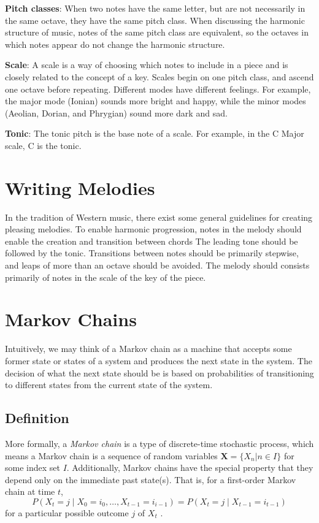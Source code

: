 \textbf{Pitch classes}: When two notes have the same letter, but are not necessarily in the same octave, they have the same pitch class.
When discussing the harmonic structure of music, notes of the same pitch class are equivalent, so the octaves in which notes appear do not change the harmonic structure.

\textbf{Scale}: A scale is a way of choosing which notes to include in a piece and is closely related to the concept of a key.
Scales begin on one pitch class, and ascend one octave before repeating.
Different modes have different feelings.
For example, the major mode (Ionian) sounds more bright and happy, while the minor modes (Aeolian, Dorian, and Phrygian) sound more dark and sad.

\textbf{Tonic}: The tonic pitch is the base note of a scale.
For example, in the C Major scale, C is the tonic.

\section{Writing Melodies} \label{bg:writingmelodies}

In the tradition of Western music, there exist some general guidelines for creating pleasing melodies.
To enable harmonic progression, notes in the melody should enable the creation and transition between chords
The leading tone should be followed by the tonic.
Transitions between notes should be primarily stepwise, and leaps of more than an octave should be avoided.
The melody should consists primarily of notes in the scale of the key of the piece.

\section[Markov Chains]{Markov Chains} \label{bg:markov}

Intuitively, we may think of a Markov chain as a machine that accepts some former state or states of a system and produces the next state in the system.
The decision of what the next state should be is based on probabilities of transitioning to different states from the current state of the system.

\subsection{Definition} \label{bg:markov:definitions}

More formally, a \textit{Markov chain} is a type of discrete-time stochastic process, which means a Markov chain is a sequence of random variables $\boldsymbol{X} = \{X_{n} | n \in I\}$ for some index set $I$.
Additionally, Markov chains have the special property that they depend only on the immediate past state(s).
That is, for a first-order Markov chain at time $t$, $$P(X_{t} = j \mid X_{0} = i_{0}, \ldots, X_{t - 1} = i_{i - 1}) = P(X_{t} = j \mid X_{t - 1} = i_{t - 1})$$ for a particular possible outcome $j$ of $X_{t}$ \cite{nierhaus_algorithmic_2009}.

